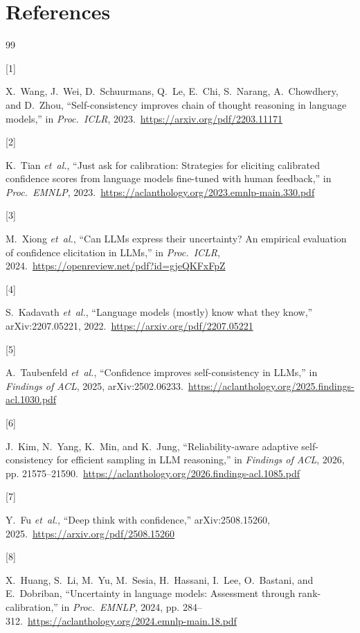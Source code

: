 \documentclass[conference]{IEEEtran}
\begin{document}
\section*{References}
\begin{thebibliography}{99}

\hypertarget{bib:wang2023selfconsistency}{[1]} 
X.~Wang, J.~Wei, D.~Schuurmans, Q.~Le, E.~Chi, S.~Narang, A.~Chowdhery, and D.~Zhou, ``Self-consistency improves chain of thought reasoning in language models,'' in \emph{Proc.\ ICLR}, 2023.\ \url{https://arxiv.org/pdf/2203.11171}

\hypertarget{bib:tian2023just}{[2]} 
K.~Tian \emph{et~al.}, ``Just ask for calibration: Strategies for eliciting calibrated confidence scores from language models fine-tuned with human feedback,'' in \emph{Proc.\ EMNLP}, 2023.\ \url{https://aclanthology.org/2023.emnlp-main.330.pdf}

\hypertarget{bib:xiong2024can}{[3]} 
M.~Xiong \emph{et~al.}, ``Can LLMs express their uncertainty? An empirical evaluation of confidence elicitation in LLMs,'' in \emph{Proc.\ ICLR}, 2024.\ \url{https://openreview.net/pdf?id=gjeQKFxFpZ}

\hypertarget{bib:kadavath2022language}{[4]} 
S.~Kadavath \emph{et~al.}, ``Language models (mostly) know what they know,'' arXiv:2207.05221, 2022.\ \url{https://arxiv.org/pdf/2207.05221}

\hypertarget{bib:taubenfeld2025cisc}{[5]} 
A.~Taubenfeld \emph{et~al.}, ``Confidence improves self-consistency in LLMs,'' in \emph{Findings of ACL}, 2025, arXiv:2502.06233.\ \url{https://aclanthology.org/2025.findings-acl.1030.pdf}

\hypertarget{bib:reasc2026}{[6]} 
J.~Kim, N.~Yang, K.~Min, and K.~Jung, ``Reliability-aware adaptive self-consistency for efficient sampling in LLM reasoning,'' in \emph{Findings of ACL}, 2026, pp. 21575--21590.\ \url{https://aclanthology.org/2026.findings-acl.1085.pdf}

\hypertarget{bib:deepconf2025}{[7]} 
Y.~Fu \emph{et~al.}, ``Deep think with confidence,'' arXiv:2508.15260, 2025.\ \url{https://arxiv.org/pdf/2508.15260}

\hypertarget{bib:huang2024rankcalibration}{[8]} 
X.~Huang, S.~Li, M.~Yu, M.~Sesia, H.~Hassani, I.~Lee, O.~Bastani, and E.~Dobriban, ``Uncertainty in language models: Assessment through rank-calibration,'' in \emph{Proc.\ EMNLP}, 2024, pp. 284--312.\ \url{https://aclanthology.org/2024.emnlp-main.18.pdf}


\end{thebibliography}
\end{document}
